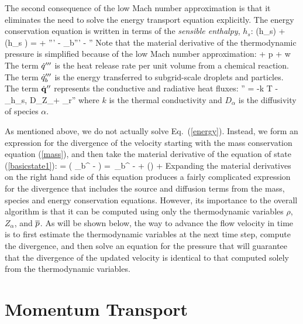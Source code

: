 The second consequence of the low Mach number approximation is that it eliminates the need to solve the energy transport
equation explicitly.
The energy conservation equation is written in terms of the {\em sensible enthalpy}, $h_s$:
\be {}(\rho h_s) + \nabla\!\cdot (\rho h_s \bu) =   + \dq''' - \dq_b'''
        - \nabla\!\cdot \dbq'' \label{energy} \ee
Note that the material derivative of the thermodynamic pressure is simplified because of the low Mach number approximation:
\be
    \equiv {} + \bu \cdot \nabla p \approx
    + w 
\ee
The term
$\dot{q}'''$ is the heat release rate per unit volume from a chemical reaction.
The term $\dot{q}_b'''$ is the energy transferred to subgrid-scale droplets and particles.
The term $\dot{\bf q}''$ represents the conductive and radiative heat fluxes:
\be \dbq'' = -k \nabla T - \sum_\alpha h_{s,\alpha} \rho D_\alpha \nabla Z_\alpha + \dbq_r'' \ee
where $k$ is the thermal conductivity and $D_\alpha$ is the diffusivity of species $\alpha$.

As mentioned above, we do not actually solve Eq.~(\ref{energy}). Instead, we form an expression for the divergence of
the velocity starting with the mass conservation equation (\ref{mass}), and then take the material
derivative of the equation of state (\ref{basicstate1}):
\be
\label{eqn_simplediv1}
\Div{} =  \left( _b^{\tripleprime} -   \right) =
 \,_b^{\tripleprime} -    +
 \left(\right) +
 
\ee
Expanding the material derivatives on the right hand side of this equation produces a fairly complicated expression for
the divergence that includes the source and diffusion terms from the mass, species and energy conservation equations.
However, its importance to the overall algorithm is that it can be computed using only the
thermodynamic variables $\rho$, $Z_\alpha$, and $\overline{p}$. As will be shown below, the way to advance the flow velocity in time
is to first estimate the thermodynamic variables at the next time step, compute the divergence, and then solve an equation
for the pressure that will guarantee that the divergence of the updated velocity is identical to that computed solely from
the thermodynamic variables.



\section{Momentum Transport}

